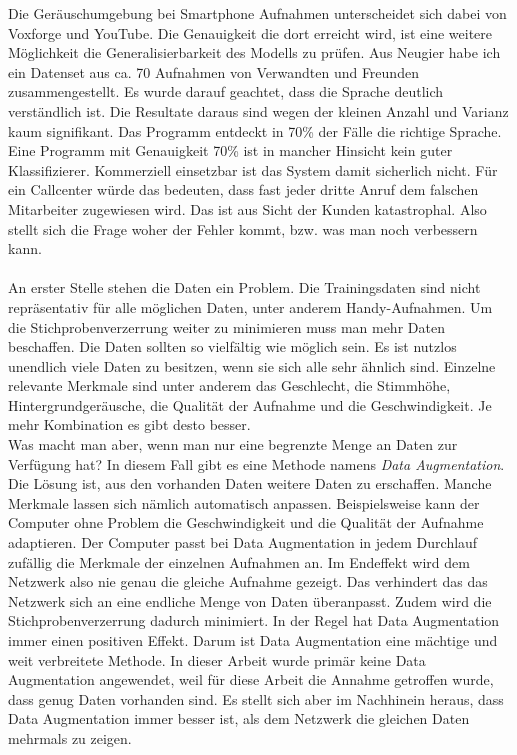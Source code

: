 Die Geräuschumgebung bei Smartphone Aufnahmen unterscheidet sich dabei von Voxforge und YouTube. Die Genauigkeit die dort erreicht wird, ist eine weitere Möglichkeit die Generalisierbarkeit des Modells zu prüfen. Aus Neugier habe ich ein Datenset aus ca. 70 Aufnahmen von Verwandten und Freunden zusammengestellt. Es wurde darauf geachtet, dass die Sprache deutlich verständlich ist. Die Resultate daraus sind wegen der kleinen Anzahl und Varianz kaum signifikant. Das Programm entdeckt in 70\% der Fälle die richtige Sprache. 
Eine Programm mit Genauigkeit 70\% ist in mancher Hinsicht kein guter Klassifizierer. Kommerziell einsetzbar ist das System damit sicherlich nicht. Für ein Callcenter würde das bedeuten, dass fast jeder dritte Anruf dem falschen Mitarbeiter zugewiesen wird. Das ist aus Sicht der Kunden katastrophal. Also stellt sich die Frage woher der Fehler kommt, bzw. was man noch verbessern kann.
\\ \\
An erster Stelle stehen die Daten ein Problem. Die Trainingsdaten sind nicht repräsentativ für alle möglichen Daten, unter anderem Handy-Aufnahmen. Um die Stichprobenverzerrung weiter zu minimieren muss man mehr Daten beschaffen. Die Daten sollten so vielfältig wie möglich sein. Es ist nutzlos unendlich viele Daten zu besitzen, wenn sie sich alle sehr ähnlich sind. Einzelne relevante Merkmale sind unter anderem das Geschlecht, die Stimmhöhe, Hintergrundgeräusche, die Qualität der Aufnahme und die Geschwindigkeit. Je mehr Kombination es gibt desto besser. 
\\
Was macht man aber, wenn man nur eine begrenzte Menge an Daten zur Verfügung hat? In diesem Fall gibt es eine Methode namens \textit{Data Augmentation}. Die Lösung ist, aus den vorhanden Daten weitere Daten zu erschaffen. Manche Merkmale lassen sich nämlich automatisch anpassen. Beispielsweise kann der Computer ohne Problem die Geschwindigkeit und die Qualität der Aufnahme adaptieren. Der Computer passt bei Data Augmentation in jedem Durchlauf zufällig die Merkmale der einzelnen Aufnahmen an. Im Endeffekt wird dem Netzwerk also nie genau die gleiche Aufnahme gezeigt. Das verhindert das das Netzwerk sich an eine endliche Menge von Daten überanpasst. Zudem wird die Stichprobenverzerrung dadurch minimiert. In der Regel hat Data Augmentation immer einen positiven Effekt. Darum ist Data Augmentation  eine mächtige und weit verbreitete Methode.  In dieser Arbeit wurde primär keine Data Augmentation angewendet, weil für diese Arbeit die Annahme getroffen wurde, dass genug Daten vorhanden sind. Es stellt sich aber im Nachhinein heraus, dass Data Augmentation immer besser ist, als dem Netzwerk die gleichen Daten mehrmals zu zeigen. 
